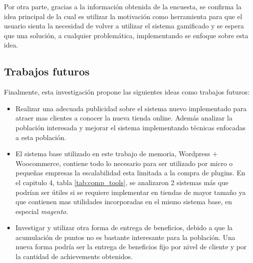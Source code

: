 Por otra parte, gracias a la información obtenida de la encuesta, se confirma la
idea principal de {\GAM} la cual es utilizar la motivación como herramienta para
que el usuario sienta la necesidad de volver a utilizar el sistema gamificado y
se espera que una solución, a cualquier problemática, implementando {\GAM} se
enfoque sobre esta idea.

\subsection{Trabajos futuros}

Finalmente, esta investigación propone las siguientes ideas como trabajos futuros:


\begin{itemize}

\item Realizar una adecuada publicidad sobre el sistema nuevo implementado para
	atraer mas clientes a conocer la nueva tienda online. Además analizar
	la población interesada y mejorar el sistema implementando técnicas 
	enfocadas a esta población.

\item El sistema base utilizado en este trabajo de memoria, Wordpress $+$ Woocommerce, contiene
todo lo necesario para ser utilizado por micro o pequeñas empresas la escalabilidad esta limitada
a la compra de plugins. En el capitulo 4, tabla \ref{tab:comp_tools}, se analizaron 2 sistemas más
que podrían ser útiles si se requiere implementar {\GAM} en tiendas de mayor tamaño ya que contienen
mas utilidades incorporadas en el mismo sistema base, en especial \emph{magento}.

\item Investigar y utilizar otra forma de entrega de beneficios, debido a que la 
acumulación de puntos no es bastante interesante para la población. Una nueva forma podría ser la entrega 
de beneficios fijo por nivel de cliente y por la cantidad de achievements obtenidos.

\end{itemize}

